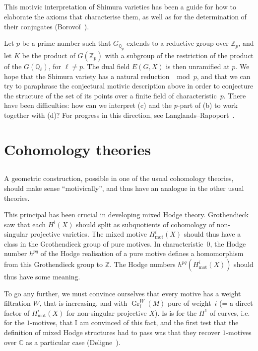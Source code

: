 \documentclass{article}
\theoremstyle{plain}
\theoremstyle{definition}
\newcommand{\ZZ}{\mathbb{Z}}
\newcommand{\QQ}{\mathbb{Q}}
\newcommand{\CC}{\mathbb{C}}
\newcommand{\mot}{\mathrm{mot}}
\DeclareMathOperator{\Gr}{Gr}
\begin{document}
\subsection{}
\label{1.8}

This motivic interpretation of Shimura varieties has been a guide for how to elaborate the axioms that characterise them, as well as for the determination of their conjugates (Borovo\v{i}~\cite{6}).

Let $p$ be a prime number such that $G_{\QQ_p}$ extends to a reductive group over $\ZZ_p$, and let $K$ be the product of $G(\ZZ_p)$ with a subgroup of the restriction of the product of the $G(\QQ_\ell)$, for $\ell\neq p$.
The dual field $E(G,X)$ is then unramified at $p$.
We hope that the Shimura variety has a natural reduction $\mod p$, and that we can try to paraphrase the conjectural motivic description above in order to conjecture the structure of the set of its points over a finite field of characteristic~$p$.
There have been difficulties: how can we interpret (c) and the $p$-part of (b) to work together with (d)?
For progress in this direction, see Langlands--Rapoport~\cite{23}.


\section{Cohomology theories}
\label{2}

\subsection{}
\label{2.1}

A geometric construction, possible in one of the usual cohomology theories, should make sense ``motivically'', and thus have an analogue in the other usual theories.

This principal has been crucial in developing mixed Hodge theory.
Grothendieck saw that each $H^i(X)$ should split as subquotients of cohomology of non-singular projective varieties.
The mixed motive $H_\mot^i(X)$ should thus have a class in the Grothendieck group of pure motives.
In characteristic~$0$, the Hodge number $h^{pq}$ of the Hodge realisation of a pure motive defines a homomorphism from this Grothendieck group to $\ZZ$.
The Hodge numbers $h^{pq}(H_\mot^i(X))$ should thus have some meaning.

To go any further, we must convince ourselves that every motive has a weight filtration $W$, that is increasing, and with $\Gr_i^W(M)$ pure of weight~$i$ (= a direct factor of $H_\mot^i(X)$ for non-singular projective $X$).
Is is for the $H^1$ of curves, i.e. for the $1$-motives, that I am convinced of this fact, and the first test that the definition of mixed Hodge structures had to pass was that they recover $1$-motives over $\CC$ as a particular case (Deligne~\cite[\S10]{9}).
\end{document}
